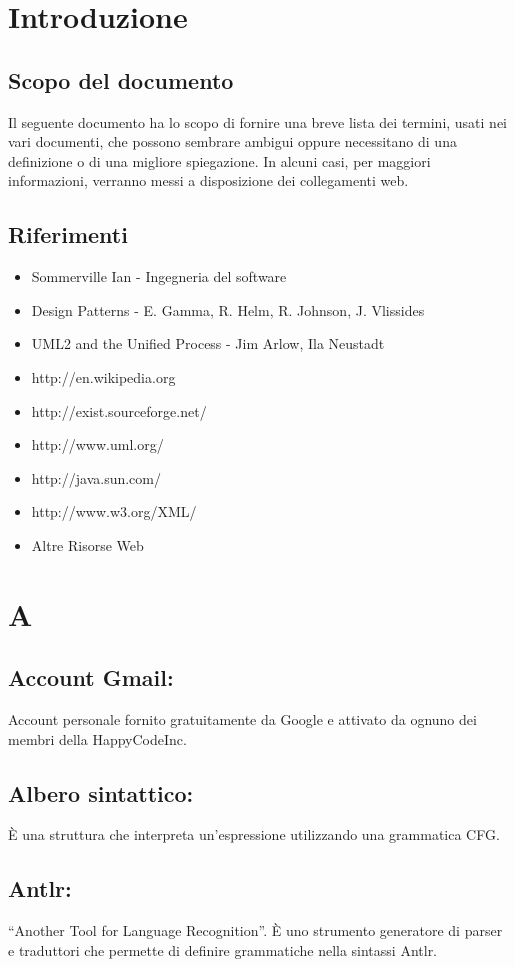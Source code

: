 \documentclass[11pt,titlepage,a4paper]{report}
\begin{document}
\chapter{Introduzione}
\section{Scopo del documento}
Il seguente documento ha lo scopo di fornire una breve lista dei termini, usati nei vari documenti, che possono sembrare ambigui oppure necessitano di una definizione o di una migliore spiegazione. In alcuni casi, per maggiori informazioni, verranno messi a disposizione dei collegamenti web.
\section{Riferimenti}
\begin{itemize}
\item Sommerville Ian - Ingegneria del software
\item Design Patterns - E. Gamma, R. Helm, R. Johnson, J. Vlissides
\item UML2 and the Unified Process - Jim Arlow, Ila Neustadt
\item http://en.wikipedia.org
\item http://exist.sourceforge.net/
\item http://www.uml.org/
\item http://java.sun.com/
\item http://www.w3.org/XML/
\item Altre Risorse Web


\end{itemize}
\chapter{A}
\section{Account Gmail:}
Account personale fornito gratuitamente da Google e attivato da ognuno dei membri della HappyCodeInc.
\section{Albero sintattico:}
\`E una struttura che interpreta un'espressione utilizzando una grammatica CFG.
\section{Antlr:}
``Another Tool for Language Recognition''. \`E uno strumento generatore di parser e traduttori che permette di definire grammatiche nella sintassi Antlr.
\end{document}
